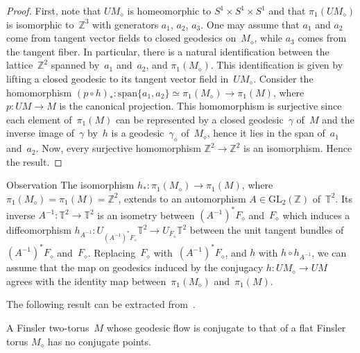 \documentclass[AHL,Unicode,longabstracts,published]{cedram}
\newcommand{\Z}{\mathbb{Z}}
\newcommand{\T}{\mathbb{T}}
\newcommand{\GL}{\mathrm{GL}}
\newcommand{\rspan}{\mathrm{span}}
\begin{document}
\begin{proof}
First, note that $UM_{\diamond}$ is homeomorphic to $S^{1}\times S^{1}\times S^{1}$ and that $\pi_{1}(UM_{\diamond})$ is isomorphic to~$\Z^{3}$ with generators $a_{1}$, $a_{2}$, $a_{3}$. One may assume that $a_{1}$ and $a_{2}$ come from tangent vector fields to closed geodesics on~$M_{\diamond}$, while $a_{3}$ comes from the tangent fiber. In particular, there is a natural identification between the lattice~$\Z^{2}$ spanned by~$a_{1}$ and~$a_{2}$, and $\pi_{1}(M_{\diamond})$. This identification is given by lifting a closed geodesic to its tangent vector field in~$UM_{\diamond}$. Consider the homomorphism $(p\circ h)_{*}:\rspan\{a_{1},a_{2}\} \simeq \pi_1(M_\diamond) \to \pi_{1}(M)$, where $p:UM \to M$ is the canonical projection. This homomorphism is surjective since each element of~$\pi_{1}(M)$ can be represented by a closed geodesic~$\gamma$ of~$M$ and the inverse image of~$\gamma$ by~$h$ is a geodesic~$\gamma_\diamond$ of~$M_\diamond$, hence it lies in the span of~$a_{1}$ and~$a_{2}$. Now, every surjective homomorphism $\Z^2 \to \Z^2$ is an isomorphism. Hence the result.
\end{proof}

\begin{enonce}{Observation} \label{obs:id}
The isomorphism $h_*:\pi_1(M_\diamond) \to \pi_1(M)$, where $\pi_1(M_\diamond)=\pi_1(M)=\Z^2$, extends to an automorphism $A \in \GL_2(\Z)$ of~$\T^2$. Its inverse $A^{-1}:\T^2 \to \T^2$ is an isometry between $(A^{-1})^*F_\diamond$ and~$F_\diamond$ which induces a diffeomorphism $h_{A^{-1}}:U_{(A^{-1})^*F_\diamond} \T^2 \to U_{F_\diamond} \T^2$ between the unit tangent bundles of~$(A^{-1})^*F_\diamond$ and~$F_\diamond$. Replacing~$F_\diamond$ with~$(A^{-1})^*F_\diamond$, and $h$ with $h \circ h_{A^{-1}}$, we can assume that the map on geodesics induced by the conjugacy $h:UM_\diamond \to UM$ agrees with the identity map between~$\pi_1(M_\diamond)$ and~$\pi_1(M)$.
\end{enonce}

The following result can be extracted from~\cite[\S~IV]{cro90}.

\begin{lemm}\label{lem:ncp}
A Finsler two-torus~$M$ whose geodesic flow is conjugate to that of a flat Finsler torus $M_{\diamond}$ has no conjugate points.
\end{lemm}
\end{document}
